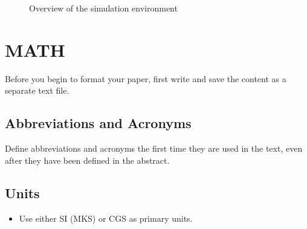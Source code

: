 \documentclass[letterpaper, 10 pt, conference]{ieeeconf}  %
\begin{document}
\begin{figure}[thpb]
   \centering
   \caption{Overview of the simulation environment}
   \label{fig:sim_env}
\end{figure}

\section{MATH}

Before you begin to format your paper, first write and save the content as a separate text file. 

\subsection{Abbreviations and Acronyms} Define abbreviations and acronyms the first time they are used in the text, even after they have been defined in the abstract. 

\subsection{Units}

\begin{itemize}

\item Use either SI (MKS) or CGS as primary units. 

\end{itemize}
\end{document}
